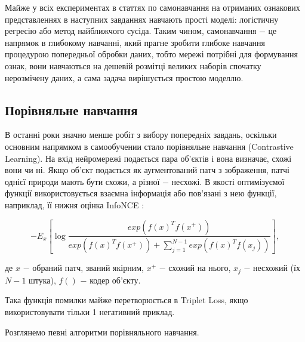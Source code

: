 Майже у всіх експериментах в статтях по самонавчання на отриманих ознакових представленнях в наступних завданнях навчають прості моделі: логістичну регресію або метод найближчого сусіда. Таким чином, самонавчання $-$ це напрямок в глибокому навчанні, який прагне зробити глибоке навчання процедурою попередньої обробки даних, тобто мережі потрібні для формування ознак, вони навчаються на дешевій розмітці великих наборів спочатку нерозмічену даних, а сама задача вирішується простою моделлю.

\vspace{1.5em}

\subsection{Порівняльне навчання}

В останні роки значно менше робіт з вибору попередніх завдань, оскільки основним напрямком в самообучении стало порівняльне навчання (Contrastive Learning). На вхід нейромережі подається пара об'єктів і вона визначає, схожі вони чи ні. Якщо об'єкт подається як аугментований патч з зображення, патчі однієї природи мають бути схожи, а різної $-$ несхожі. В якості оптимізуємої функції використовується взаємна інформація або пов'язані з нею функції, наприклад, її нижня оцінка InfoNCE :

\begin{equation}\label{eq:infonce}
-E_{x}\left[ \log{\frac{exp(f(x)^{T}f(x^{+}))}{exp(f(x)^{T}f(x^{+}))+\sum_{j=1}^{N-1}exp(f(x)^{T}f(x_{j}))}} \right],
\end{equation}

\noindent де $x$ $-$ обраний патч, званий якірним, \newline
\hspace*{15pt} $x^{+}$ $-$ схожий на нього, \newline
\hspace*{15pt} $x_{j}$ $-$ несхожий (їх $N-1$ штука), \newline
\hspace*{15pt} $f()$ $-$ кодер об'єкту. 

\vspace{1.5em}

Така функція помилки майже перетворюється в Triplet Loss, якщо використовувати тільки 1 негативний приклад.

Розглянемо певні алгоритми порівняльного навчання.

\vspace{1.5em}

